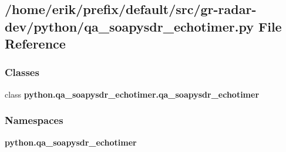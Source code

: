 \subsection{/home/erik/prefix/default/src/gr-\/radar-\/dev/python/qa\+\_\+soapysdr\+\_\+echotimer.py File Reference}
\label{qa__soapysdr__echotimer_8py}
\subsubsection*{Classes}
\begin{DoxyCompactItemize}
\item 
class {\bf python.\+qa\+\_\+soapysdr\+\_\+echotimer.\+qa\+\_\+soapysdr\+\_\+echotimer}
\end{DoxyCompactItemize}
\subsubsection*{Namespaces}
\begin{DoxyCompactItemize}
\item 
 {\bf python.\+qa\+\_\+soapysdr\+\_\+echotimer}
\end{DoxyCompactItemize}
